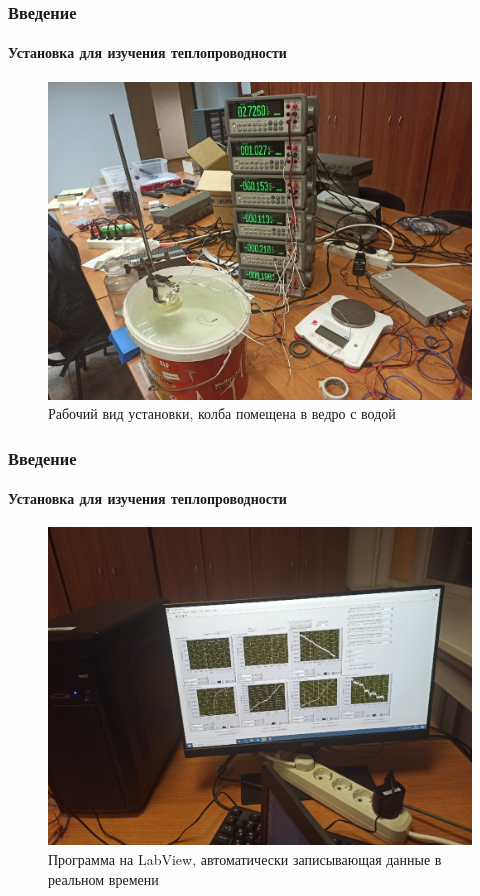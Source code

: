 \documentclass[8pt,pdf,hyperref={unicode}]{beamer}
\begin{document}
	\begin{frame}
		\frametitle{Введение}
		\framesubtitle{Установка для изучения теплопроводности}
		\begin{center}
			\begin{figure}[h!]
				\centering
				\includegraphics[width=.7\linewidth]{4.jpg}
				\caption{Рабочий вид установки,	колба помещена в ведро с водой}
				\label{fig4}
			\end{figure}
		\end{center}
	\end{frame}
	\begin{frame}
		\frametitle{Введение}
		\framesubtitle{Установка для изучения теплопроводности}
		\begin{center}
			\begin{figure}[h!]
				\centering
				\includegraphics[width=.7\linewidth]{5.jpg}
				\caption{Программа на LabView, автоматически записывающая данные в реальном времени}
				\label{fig5}
			\end{figure}
		\end{center}
	\end{frame}
\end{document}
